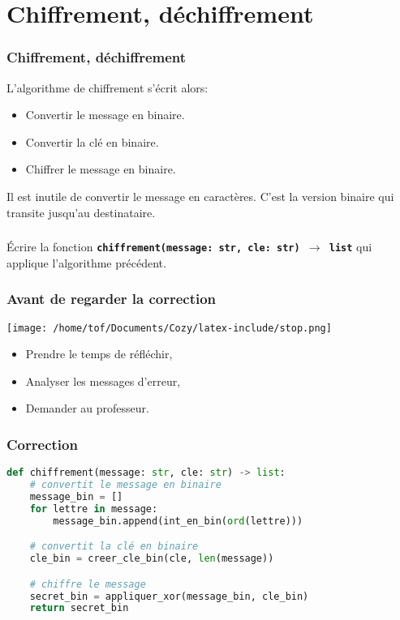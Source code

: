 \documentclass[svgnames,11pt]{beamer}
\begin{document}
\section{Chiffrement, déchiffrement}
\begin{frame}
    \frametitle{Chiffrement, déchiffrement}

L'algorithme de chiffrement s'écrit alors:
\begin{itemize}
    \item Convertir le message en binaire.
    \item Convertir la clé en binaire.
    \item Chiffrer le message en binaire.
\end{itemize}
\begin{aretenir}[Remarque]
Il est inutile de convertir le message en caractères. C'est la version binaire qui transite jusqu'au destinataire.
\end{aretenir}
\end{frame}
\begin{frame}
    \frametitle{}

    \begin{activite}
    Écrire la fonction \textbf{\texttt{chiffrement(message: str, cle: str) $\rightarrow$ list}} qui applique l'algorithme précédent.
    \end{activite}

\end{frame}
\begin{frame}
    \frametitle{Avant de regarder la correction}
\begin{center}
    \centering
    \texttt{[image: /home/tof/Documents/Cozy/latex-include/stop.png]}
    \end{center}
{\Large
    \begin{itemize}
        \item Prendre le temps de réfléchir,
        \item Analyser les messages d'erreur,
        \item Demander au professeur.
    \end{itemize}
}
\end{frame}
\begin{frame}[fragile]
    \frametitle{Correction}

\begin{center}
\begin{lstlisting}[language=Python , basicstyle=\ttfamily\small, xleftmargin=0.2em, xrightmargin=0em]
def chiffrement(message: str, cle: str) -> list:
    # convertit le message en binaire
    message_bin = []
    for lettre in message:
        message_bin.append(int_en_bin(ord(lettre)))

    # convertit la clé en binaire
    cle_bin = creer_cle_bin(cle, len(message))

    # chiffre le message
    secret_bin = appliquer_xor(message_bin, cle_bin)
    return secret_bin
\end{lstlisting}
\end{center}

\end{frame}
\end{document}
